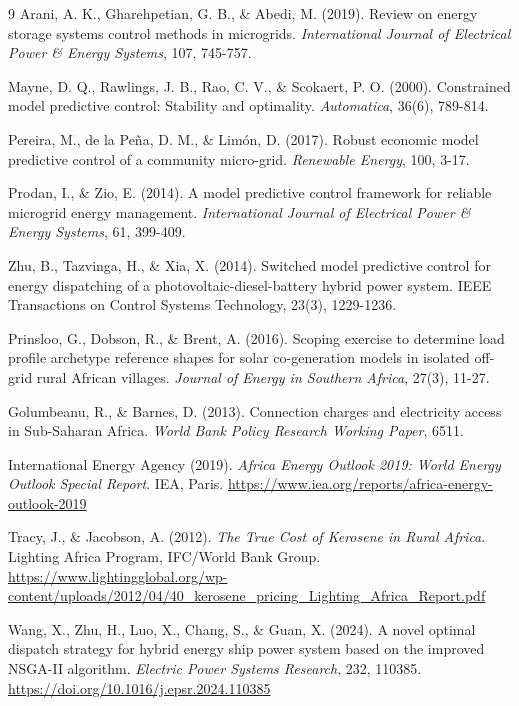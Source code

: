 \documentclass[final,3p,times]{elsarticle}
\begin{document}
\begin{thebibliography}{9}
Arani, A. K., Gharehpetian, G. B., \& Abedi, M. (2019). Review on energy storage systems control methods in microgrids. \textit{International Journal of Electrical Power \& Energy Systems}, 107, 745-757.

Mayne, D. Q., Rawlings, J. B., Rao, C. V., \& Scokaert, P. O. (2000). Constrained model predictive control: Stability and optimality. \textit{Automatica}, 36(6), 789-814.

Pereira, M., de la Peña, D. M., \& Limón, D. (2017). Robust economic model predictive control of a community micro-grid. \textit{Renewable Energy}, 100, 3-17.

Prodan, I., \& Zio, E. (2014). A model predictive control framework for reliable microgrid energy management. \textit{International Journal of Electrical Power \& Energy Systems}, 61, 399-409.

Zhu, B., Tazvinga, H., \& Xia, X. (2014). Switched model predictive control for energy dispatching of a photovoltaic-diesel-battery hybrid power system. IEEE Transactions on Control Systems Technology, 23(3), 1229-1236.

Prinsloo, G., Dobson, R., \& Brent, A. (2016). Scoping exercise to determine load profile archetype reference shapes for solar co-generation models in isolated off-grid rural African villages. \textit{Journal of Energy in Southern Africa}, 27(3), 11-27.

Golumbeanu, R., \& Barnes, D. (2013). Connection charges and electricity access
in Sub-Saharan Africa. \textit{World Bank Policy Research Working Paper}, 6511.

International Energy Agency (2019). \textit{Africa Energy Outlook 2019: World
Energy Outlook Special Report}. IEA, Paris.
\url{https://www.iea.org/reports/africa-energy-outlook-2019}

Tracy, J., \& Jacobson, A. (2012). \textit{The True Cost of Kerosene in Rural
Africa}. Lighting Africa Program, IFC/World Bank Group.
\url{https://www.lightingglobal.org/wp-content/uploads/2012/04/40_kerosene_pricing_Lighting_Africa_Report.pdf}


Wang, X., Zhu, H., Luo, X., Chang, S., \& Guan, X. (2024). A novel optimal dispatch strategy for hybrid energy ship power system based on the improved NSGA-II algorithm. \textit{Electric Power Systems Research}, 232, 110385. \url{https://doi.org/10.1016/j.epsr.2024.110385}


\end{thebibliography}
\end{document}
